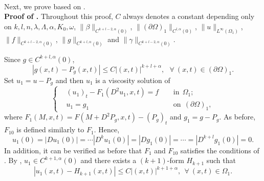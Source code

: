 \documentclass[preprint,12pt]{elsarticle}
\theoremstyle{definition}
\theoremstyle{remark}
\newtheorem{remark}[theorem]{Remark}
\numberwithin{equation}{section}
\begin{document}
~\\

Next, we prove  based on .\\
\noindent\textbf{Proof of .} Throughout this proof, $C$ always denotes a constant depending only on $ k, l, n, \lambda, \Lambda, \alpha,K_0,\omega$, $\|\beta\|_{C^{k+l-2,\alpha}(0)}$, $\|(\partial \Omega)_1\|_{C^{l,\alpha}(0)}$, $\|u\|_{L^{\infty}(\Omega_1)}$, $\|f\|_{C^{k+l-2,\alpha}(0)}$, $\|g\|_{C^{k+l,\alpha}(0)}$ and $\|\gamma\|_{C^{k+l-2,\alpha}(0)}$.

Since $g\in C^{k+l,\alpha}(0)$,
\begin{equation*}
  |g(x,t)-P_g(x,t)|\leq C|(x,t)|^{k+l+\alpha},~~~\forall ~(x,t)\in (\partial \Omega)_1.
\end{equation*}
Set $u_1=u-P_g$ and then $u_1$ is a viscosity solution of
\begin{equation*}
\left\{\begin{aligned}
&(u_1)_t-F_1(D^2u_1,x,t)=f&& ~~\mbox{in}~~\Omega_1;\\
&u_1=g_1&& ~~\mbox{on}~~(\partial \Omega)_1,
\end{aligned}\right.
\end{equation*}
where $F_1(M,x,t)=F(M+D^2P_g,x,t)-(P_g)_t$ and $g_1=g-P_g$. As before, $F_{10}$ is defined similarly to $F_1$. Hence,
\begin{equation}\label{e.Ckla.gnorm}
u_1(0)=|Du_1(0)|=\cdots|D^ku_1(0)|=|Dg_1(0)|=\cdots=|D^{k+l}g_1(0)|=0.
\end{equation}
In addition, it can be verified as before that $F_1$ and $F_{10}$ satisfies the conditions of .
By , $u_1\in  C^{k+1,\alpha}(0)$ and there exists a $(k+1)$-form $H_{k+1}$ such that
\begin{equation*}
|u_1(x,t)-H_{k+1}(x,t)|\leq C |(x,t)|^{k+1+\alpha},~~\forall ~(x,t)\in \Omega_{1}.
\end{equation*}
\end{document}
